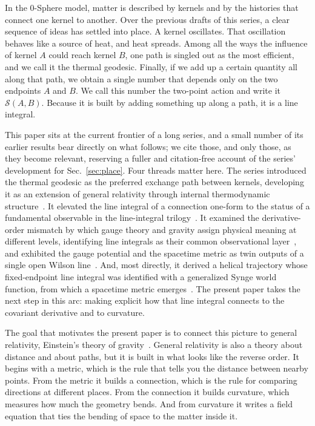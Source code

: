 \documentclass[%
 reprint, amsmath,amssymb, aps, prb, ]{revtex4-2}
\numberwithin{equation}{section}
\begin{document}
In the 0-Sphere model, matter is described by kernels and by the histories that connect one kernel to another. Over the previous drafts of this series, a clear sequence of ideas has settled into place. A kernel oscillates. That oscillation behaves like a source of heat, and heat spreads. Among all the ways the influence of kernel $A$ could reach kernel $B$, one path is singled out as the most efficient, and we call it the thermal geodesic. Finally, if we add up a certain quantity all along that path, we obtain a single number that depends only on the two endpoints $A$ and $B$. We call this number the two-point action and write it $\mathcal{S}(A,B)$. Because it is built by adding something up along a path, it is a line integral.

This paper sits at the current frontier of a long series, and a small number of its earlier results bear directly on what follows; we cite those, and only those, as they become relevant, reserving a fuller and citation-free account of the series' development for Sec.~\ref{sec:place}. Four threads matter here. The series introduced the thermal geodesic as the preferred exchange path between kernels, developing it as an extension of general relativity through internal thermodynamic structure~\cite{hanamura24,hanamura29}. It elevated the line integral of a connection one-form to the status of a fundamental observable in the line-integral trilogy~\cite{hanamura29,hanamura30,hanamura31}. It examined the derivative-order mismatch by which gauge theory and gravity assign physical meaning at different levels, identifying line integrals as their common observational layer~\cite{hanamura40,hanamura41}, and exhibited the gauge potential and the spacetime metric as twin outputs of a single open Wilson line~\cite{hanamura55}. And, most directly, it derived a helical trajectory whose fixed-endpoint line integral was identified with a generalized Synge world function, from which a spacetime metric emerges~\cite{hanamura51}. The present paper takes the next step in this arc: making explicit how that line integral connects to the covariant derivative and to curvature.

The goal that motivates the present paper is to connect this picture to general relativity, Einstein's theory of gravity~\cite{MTW1973}. General relativity is also a theory about distance and about paths, but it is built in what looks like the reverse order. It begins with a metric, which is the rule that tells you the distance between nearby points. From the metric it builds a connection, which is the rule for comparing directions at different places. From the connection it builds curvature, which measures how much the geometry bends. And from curvature it writes a field equation that ties the bending of space to the matter inside it.
\end{document}

